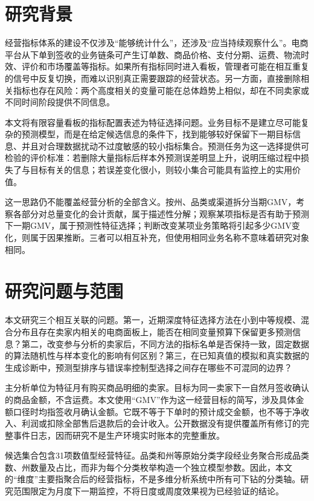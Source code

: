\documentclass{sufethesismas}
\begin{document}
\section{研究背景}

经营指标体系的建设不仅涉及``能够统计什么''，还涉及``应当持续观察什么''。电商平台从下单到签收的业务链条可产生订单数、商品价格、支付分期、运费、物流时效、评价和市场覆盖等指标。如果所有指标同时进入看板，管理者可能在相互重复的信号中反复切换，而难以识别真正需要跟踪的经营状态。另一方面，直接删除相关指标也存在风险：两个高度相关的变量可能在总体趋势上相似，却在不同卖家或不同时间阶段提供不同信息。

本文将有限容量看板的指标配置表述为特征选择问题。业务目标不是建立尽可能复杂的预测模型，而是在给定候选信息的条件下，找到能够较好保留下一期目标信息、并且对合理数据扰动不过度敏感的较小指标集合。预测任务为这一选择提供可检验的评价标准：若删除大量指标后样本外预测误差明显上升，说明压缩过程中损失了与目标有关的信息；若误差变化很小，则较小集合可能具有监控上的实用价值。

这一思路仍不能覆盖经营分析的全部含义。按州、品类或渠道拆分当期GMV，考察各部分对总量变化的会计贡献，属于描述性分解；观察某项指标是否有助于预测下一期GMV，属于预测性特征选择；判断改变某项业务策略将引起多少GMV变化，则属于因果推断。三者可以相互补充，但使用相同业务名称不意味着研究对象相同。

\section{研究问题与范围}

本文研究三个相互关联的问题。第一，近期深度特征选择方法在小到中等规模、混合分布且存在卖家内相关的电商面板上，能否在相同变量预算下保留更多预测信息？第二，改变参与分析的卖家后，不同方法的指标名单是否保持一致，固定数据的算法随机性与样本变化的影响有何区别？第三，在已知真值的模拟和真实数据的生成诊断中，预测型排序与错误率控制型选择之间存在哪些不可混同的边界？

主分析单位为特征月有购买商品明细的卖家。目标为同一卖家下一自然月签收确认的商品金额，不含运费。本文使用``GMV''作为这一经营目标的简写，涉及具体金额口径时均指签收月确认金额。它既不等于下单时的预计成交金额，也不等于净收入、利润或扣除全部售后退款后的会计收入。公开数据没有提供覆盖所有修订的完整事件日志，因而研究不是生产环境实时账本的完整重放。

候选集合包含31项数值型经营特征。品类和州等原始分类字段经业务聚合形成品类数、州数量及占比，而非为每个分类枚举构造一个独立模型参数。因此，本文的``维度''主要指聚合后的经营指标，不是多维分析系统中所有可下钻的分类轴。研究范围限定为月度下一期监控，不将日度或周度效果视为已经验证的结论。
\end{document}
